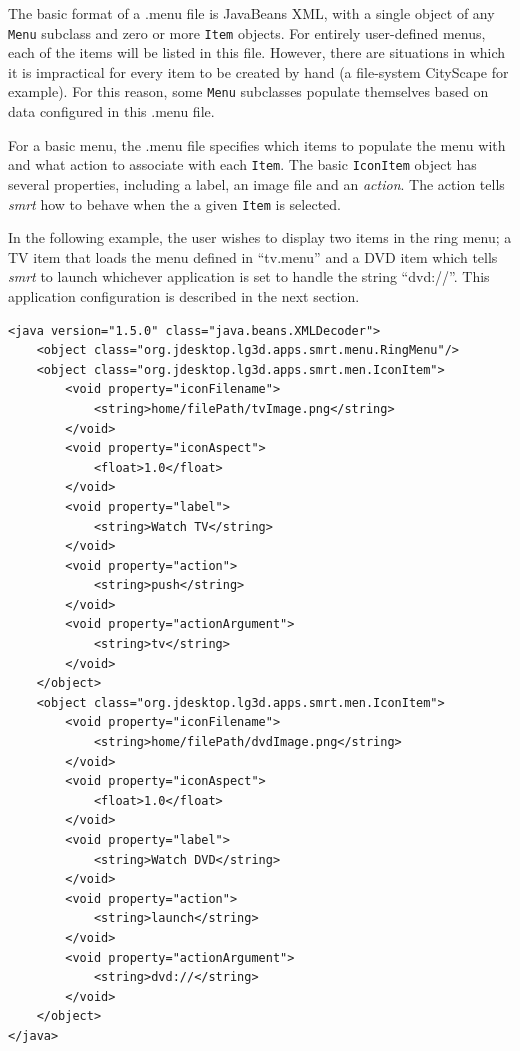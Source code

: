 \documentclass[letterpaper, titlepage, 11pt]{article}
\begin{document}
The basic format of a .menu file is JavaBeans XML, with a single object of any
\texttt{Menu} subclass and zero or more \texttt{Item} objects.  For entirely
user-defined menus, each of the items will be listed in this file.  However,
there are situations in which it is impractical for every item to be created by
hand (a file-system CityScape for example).  For this reason, some \texttt{Menu}
subclasses populate themselves based on data configured in this .menu file.

For a basic menu, the .menu file specifies which items to populate the menu with
and what action to associate with each \texttt{Item}.  The basic
\texttt{IconItem} object has several properties, including a label, an image
file and an \textit{action}. The action tells \textit{smrt} how to behave when
the a given \texttt{Item} is selected.

In the following example, the user wishes to display two items in the ring
menu; a TV item that loads the menu defined in ``tv.menu'' and a DVD item which
tells \textit{smrt} to launch whichever application is set to handle the string
``dvd://''.  This application configuration is described in the next section.

\begin{verbatim}
<java version="1.5.0" class="java.beans.XMLDecoder">
    <object class="org.jdesktop.lg3d.apps.smrt.menu.RingMenu"/>
    <object class="org.jdesktop.lg3d.apps.smrt.men.IconItem">
        <void property="iconFilename">
            <string>home/filePath/tvImage.png</string>
        </void>
        <void property="iconAspect">
            <float>1.0</float>
        </void>
        <void property="label">
            <string>Watch TV</string>
        </void>
        <void property="action">
            <string>push</string>
        </void>
        <void property="actionArgument">
            <string>tv</string>
        </void>
    </object>
    <object class="org.jdesktop.lg3d.apps.smrt.men.IconItem">
        <void property="iconFilename">
            <string>home/filePath/dvdImage.png</string>
        </void>
        <void property="iconAspect">
            <float>1.0</float>
        </void>
        <void property="label">
            <string>Watch DVD</string>
        </void>
        <void property="action">
            <string>launch</string>
        </void>
        <void property="actionArgument">
            <string>dvd://</string>
        </void>
    </object>
</java>
\end{verbatim}
\end{document}
